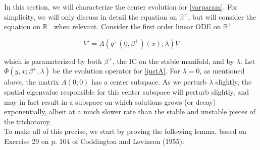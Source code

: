 \documentclass[12pt]{article}
\def\R{{\mathbb R}}
\begin{document}
In this section, we will characterize the center evolution for \eqref{varparam}. For simplicity, we will only discuss in detail the equation on $\R^+$, but will consider the equation on $\R^-$ when relevant. Consider the first order linear ODE on $\R^+$

\begin{equation}\label{justA}
V' = A(q^+(0, \beta^+)(x); \lambda) V
\end{equation}

which is paramaterized by both $\beta^+$, the IC on the stable manifold, and by $\lambda$. Let $\Phi(y, x; \beta^+, \lambda)$ be the evolution operator for \eqref{justA}. For $\lambda = 0$, as mentioned above, the matrix $A(0; 0)$ has a center subspace. As we perturb $\lambda$ slightly, the spatial eigenvalue responsible for this center subspace will perturb slightly, and may in fact result in a subspace on which solutions grows (or decay) exponentially, albeit at a much slower rate than the stable and unstable pieces of the trichotomy.\\

To make all of this precise, we start by proving the following lemma, based on Exercise 29 on p. 104 of Coddington and Levinson (1955).

\end{document}
